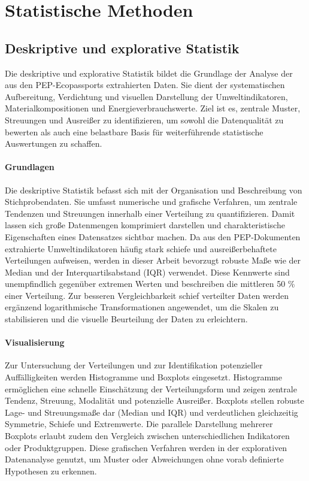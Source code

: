 \section{Statistische Methoden}

\subsection{Deskriptive und explorative Statistik}

Die deskriptive und explorative Statistik bildet die Grundlage der Analyse der aus den PEP-Ecopassports extrahierten Daten. 
Sie dient der systematischen Aufbereitung, Verdichtung und visuellen Darstellung der Umweltindikatoren, 
Materialkompositionen und Energieverbrauchswerte. 
Ziel ist es, zentrale Muster, Streuungen und Ausreißer zu identifizieren, um sowohl die Datenqualität zu bewerten als auch
eine belastbare Basis für weiterführende statistische Auswertungen zu schaffen.

\paragraph{Grundlagen}
Die deskriptive Statistik befasst sich mit der Organisation und Beschreibung von Stichprobendaten.  \cite{Fisher2009}
Sie umfasst numerische und grafische Verfahren, um zentrale Tendenzen und Streuungen innerhalb einer Verteilung zu quantifizieren. 
Damit lassen sich große Datenmengen komprimiert darstellen und charakteristische Eigenschaften eines Datensatzes sichtbar machen. 
Da aus den PEP-Dokumenten extrahierte Umweltindikatoren häufig stark schiefe und ausreißerbehaftete Verteilungen aufweisen, 
werden in dieser Arbeit bevorzugt robuste Maße wie der Median und der Interquartilsabstand (IQR) verwendet. 
Diese Kennwerte sind unempfindlich gegenüber extremen Werten und beschreiben die mittleren 50 \% einer Verteilung. 
Zur besseren Vergleichbarkeit schief verteilter Daten werden ergänzend logarithmische Transformationen angewendet, 
um die Skalen zu stabilisieren und die visuelle Beurteilung der Daten zu erleichtern.

\paragraph{Visualisierung}
Zur Untersuchung der Verteilungen und zur Identifikation potenzieller Auffälligkeiten werden Histogramme und Boxplots eingesetzt. 
Histogramme ermöglichen eine schnelle Einschätzung der Verteilungsform und zeigen zentrale Tendenz, Streuung, Modalität und potenzielle Ausreißer. 
Boxplots stellen robuste Lage- und Streuungsmaße dar (Median und IQR) und verdeutlichen gleichzeitig Symmetrie, Schiefe und Extremwerte. 
Die parallele Darstellung mehrerer Boxplots erlaubt zudem den Vergleich zwischen unterschiedlichen Indikatoren oder Produktgruppen. 
Diese grafischen Verfahren werden in der explorativen Datenanalyse genutzt, um Muster oder Abweichungen ohne vorab definierte Hypothesen zu erkennen.

